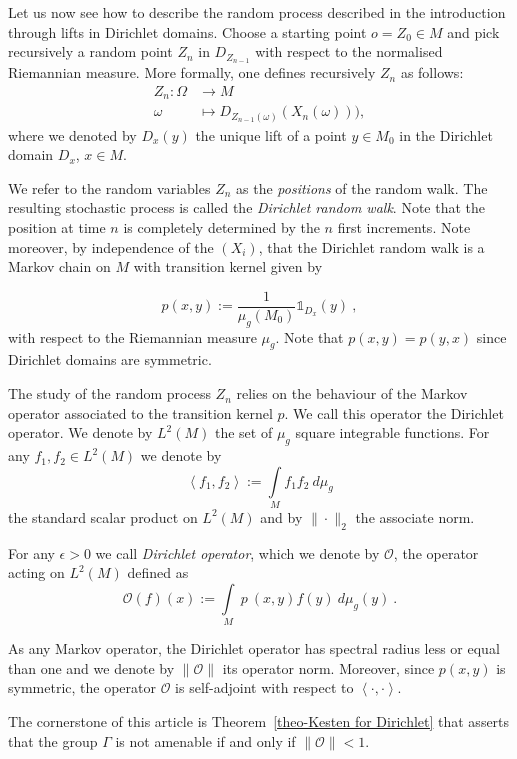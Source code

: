 \documentclass[AHL,Unicode,longabstracts,published]{cedram}
\newcommand{\dsun}{\mathds{1}}
\newcommand{\cO}{\mathcal{O}}
\newcommand{\inte}[1]{\underset{#1}{\int}}
\newcommand{\tv}{\rightarrow}
\newcommand{\G}{\Gamma}
\begin{document}
Let us now see how to describe the random process described in the introduction through lifts in Dirichlet domains. Choose a starting point $o = Z_0 \in M$ and pick recursively a random point $Z_n$ in $D_{Z_{n-1}} $ with respect to the normalised Riemannian measure. More formally, one defines recursively $Z_n$ as follows:
\begin{align*}
Z_n : \Omega &\tv M
\\
\omega &\mapsto D_{Z_{n-1}(\omega)} (X_n(\omega))),
\end{align*}
where we denoted by $ D_x(y)$ the unique lift of a point $y \in M_0$ in the Dirichlet domain $D_x$, $x \in M$. 

We refer to the random variables $Z_n$ as the \emph{positions} of the random walk. The resulting stochastic process is called the \emph{Dirichlet random walk}. Note that the position at time $n$ is completely determined by the $n$ first increments. Note moreover, by independence of the $(X_i)$, that the Dirichlet random walk is a Markov chain on $M$ with transition kernel given by

\[
p(x,y) := \frac{1}{\mu_g(M_0)} \dsun_{D_x}(y) \ ,
\]
with respect to the Riemannian measure $\mu_g$. Note that $p(x,y) = p(y,x)$ since Dirichlet domains are symmetric. 

The study of the random process $Z_n$ relies on the behaviour of the Markov operator associated to the transition kernel $p$. We call this operator the Dirichlet operator. We denote by $L^2(M)$ the set of $\mu_g$ square integrable functions. For any $f_1,f_2 \in L^2(M)$ we denote by
\[
\left\langle f_1,f_2 \right\rangle := \inte{M} f_1 f_2 \ d \mu_g
\]
the standard scalar product on $L^2(M)$ and by $\| \cdot \|_{2}$ the associate norm.

\begin{defi}
For any $\epsilon > 0$ we call \emph{Dirichlet operator}, which we denote by $\cO$, the operator acting on $L^2(M)$ defined as
\[
\cO(f)(x) := \inte{M} \ p~(x,y)f(y) \ d \mu_g(y) \ .
\]
\end{defi}

As any Markov operator, the Dirichlet operator has spectral radius less or equal than one and we denote by $\| \cO \|$ its operator norm. Moreover, since $p(x,y)$ is symmetric, the operator $\cO$ is self-adjoint with respect to $\left<\cdot, \cdot \right>$. 

The cornerstone of this article is Theorem~\ref{theo-Kesten for Dirichlet} that asserts that the group $\G$ is not amenable if and only if $\| \cO\| < 1$. 
\end{document}
